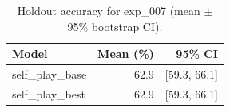 \begin{table}[ht]
\centering
\caption{Holdout accuracy for exp_007 (mean $\pm$ 95\% bootstrap CI).}
\label{tab:exp_007}
\begin{tabular}{lrr}
\toprule
Model & Mean (\%) & 95\% CI \\
\midrule
self\_play\_base & 62.9 & [59.3, 66.1] \\
self\_play\_best & 62.9 & [59.3, 66.1] \\
\bottomrule
\end{tabular}
\end{table}
